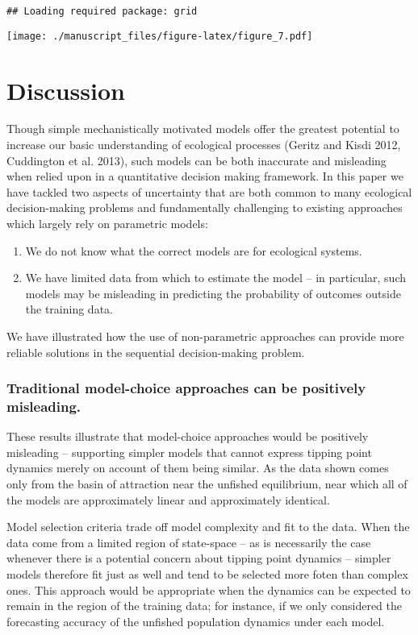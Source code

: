 \documentclass[]{components/elsarticle}
\begin{document}
\begin{verbatim}
## Loading required package: grid
\end{verbatim}

\texttt{[image: ./manuscript\_files/figure-latex/figure\_7.pdf]}

\section{Discussion}\label{discussion}

Though simple mechanistically motivated models offer the greatest
potential to increase our basic understanding of ecological processes
(Geritz and Kisdi 2012, Cuddington et al. 2013), such models can be both
inaccurate and misleading when relied upon in a quantitative decision
making framework. In this paper we have tackled two aspects of
uncertainty that are both common to many ecological decision-making
problems and fundamentally challenging to existing approaches which
largely rely on parametric models:

\begin{enumerate}
\def\labelenumi{\arabic{enumi}.}
\itemsep1pt\parskip0pt
\item
  We do not know what the correct models are for ecological systems.
\item
  We have limited data from which to estimate the model -- in
  particular, such models may be misleading in predicting the
  probability of outcomes outside the training data.
\end{enumerate}

We have illustrated how the use of non-parametric approaches can provide
more reliable solutions in the sequential decision-making problem.

\subsubsection{Traditional model-choice approaches can be positively
misleading.}\label{traditional-model-choice-approaches-can-be-positively-misleading.}

These results illustrate that model-choice approaches would be
positively misleading -- supporting simpler models that cannot express
tipping point dynamics merely on account of them being similar. As the
data shown comes only from the basin of attraction near the unfished
equilibrium, near which all of the models are approximately linear and
approximately identical.

Model selection criteria trade off model complexity and fit to the data.
When the data come from a limited region of state-space -- as is
necessarily the case whenever there is a potential concern about tipping
point dynamics -- simpler models therefore fit just as well and tend to
be selected more foten than complex ones. This approach would be
appropriate when the dynamics can be expected to remain in the region of
the training data; for instance, if we only considered the forecasting
accuracy of the unfished population dynamics under each model.
\end{document}
